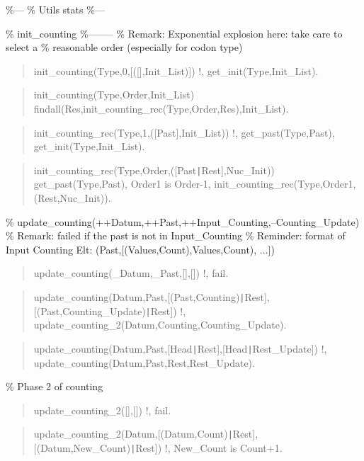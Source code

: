 \%---
\% Utils stats
\%---

\% init_counting
\%--------
\% Remark: Exponential explosion here: take care to select a
\% reasonable order (especially for codon type)

\begin{quote}
init_counting(Type,0,[([],Init_List)]) \Sneck{}
!,
get_init(Type,Init_List).
\end{quote}

\begin{quote}
init_counting(Type,Order,Init_List) \Sneck{}
findall(Res,init_counting_rec(Type,Order,Res),Init_List).
\end{quote}

\begin{quote}
init_counting_rec(Type,1,([Past],Init_List)) \Sneck{}
!,
get_past(Type,Past),
get_init(Type,Init_List).
\end{quote}

\begin{quote}
init_counting_rec(Type,Order,([Past{\tt\string|}Rest],Nuc_Init)) \Sneck{}
get_past(Type,Past),
Order1 is Order-1,
init_counting_rec(Type,Order1,(Rest,Nuc_Init)).
\end{quote}

\% update_counting(++Datum,++Past,++Input_Counting,--Counting_Update)
\% Remark: failed if the past is not in Input_Counting
\% Reminder: format of Input Counting Elt: (Past,[(Values,Count),Values,Count), ...])

\begin{quote}
update_counting(_Datum,_Past,[],[]) \Sneck{}
!,
fail.
\end{quote}

\begin{quote}
update_counting(Datum,Past,[(Past,Counting){\tt\string|}Rest],[(Past,Counting_Update){\tt\string|}Rest]) \Sneck{}
!,
update_counting_2(Datum,Counting,Counting_Update).
\end{quote}

\begin{quote}
update_counting(Datum,Past,[Head{\tt\string|}Rest],[Head{\tt\string|}Rest_Update]) \Sneck{}
!,
update_counting(Datum,Past,Rest,Rest_Update).
\end{quote}

\% Phase 2 of counting

\begin{quote}
update_counting_2([],[]) \Sneck{}
!,
fail.
\end{quote}

\begin{quote}
update_counting_2(Datum,[(Datum,Count){\tt\string|}Rest],[(Datum,New_Count){\tt\string|}Rest])\Sneck{}
!,
New_Count is Count+1.
\end{quote}

